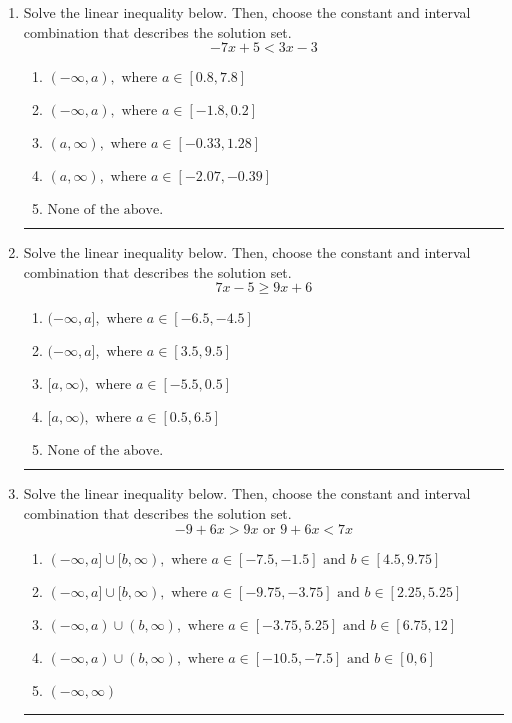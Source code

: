 \documentclass[14pt]{extbook}
\newcommand{\litem}[1]{\item#1\hspace*{-1cm}\rule{\textwidth}{0.4pt}}
\begin{document}
\begin{enumerate}
{\begin{enumerate}[label=\Alph*.]
\end{enumerate} }
\litem{
Solve the linear inequality below. Then, choose the constant and interval combination that describes the solution set.\[ -7x + 5 < 3x -3 \]\begin{enumerate}[label=\Alph*.]
\item \( (-\infty, a), \text{ where } a \in [0.8, 7.8] \)
\item \( (-\infty, a), \text{ where } a \in [-1.8, 0.2] \)
\item \( (a, \infty), \text{ where } a \in [-0.33, 1.28] \)
\item \( (a, \infty), \text{ where } a \in [-2.07, -0.39] \)
\item \( \text{None of the above}. \)

\end{enumerate} }
\litem{
Solve the linear inequality below. Then, choose the constant and interval combination that describes the solution set.\[ 7x -5 \geq 9x + 6 \]\begin{enumerate}[label=\Alph*.]
\item \( (-\infty, a], \text{ where } a \in [-6.5, -4.5] \)
\item \( (-\infty, a], \text{ where } a \in [3.5, 9.5] \)
\item \( [a, \infty), \text{ where } a \in [-5.5, 0.5] \)
\item \( [a, \infty), \text{ where } a \in [0.5, 6.5] \)
\item \( \text{None of the above}. \)

\end{enumerate} }
\litem{
Solve the linear inequality below. Then, choose the constant and interval combination that describes the solution set.\[ -9 + 6 x > 9 x \text{ or } 9 + 6 x < 7 x \]\begin{enumerate}[label=\Alph*.]
\item \( (-\infty, a] \cup [b, \infty), \text{ where } a \in [-7.5, -1.5] \text{ and } b \in [4.5, 9.75] \)
\item \( (-\infty, a] \cup [b, \infty), \text{ where } a \in [-9.75, -3.75] \text{ and } b \in [2.25, 5.25] \)
\item \( (-\infty, a) \cup (b, \infty), \text{ where } a \in [-3.75, 5.25] \text{ and } b \in [6.75, 12] \)
\item \( (-\infty, a) \cup (b, \infty), \text{ where } a \in [-10.5, -7.5] \text{ and } b \in [0, 6] \)
\item \( (-\infty, \infty) \)


\end{enumerate}}
\end{enumerate}
\end{document}
